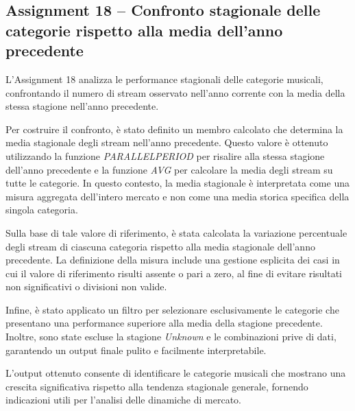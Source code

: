 \subsection*{Assignment 18 -- Confronto stagionale delle categorie rispetto alla media dell’anno precedente}

L’Assignment 18 analizza le performance stagionali delle categorie musicali,
confrontando il numero di stream osservato nell’anno corrente con la media della
stessa stagione nell’anno precedente.

Per costruire il confronto, è stato definito un membro calcolato che determina la
media stagionale degli stream nell’anno precedente. Questo valore è ottenuto
utilizzando la funzione \textit{PARALLELPERIOD} per risalire alla stessa stagione
dell’anno precedente e la funzione \textit{AVG} per calcolare la media degli
stream su tutte le categorie. In questo contesto, la media stagionale è
interpretata come una misura aggregata dell’intero mercato e non come una media
storica specifica della singola categoria.

Sulla base di tale valore di riferimento, è stata calcolata la variazione
percentuale degli stream di ciascuna categoria rispetto alla media stagionale
dell’anno precedente. La definizione della misura include una gestione esplicita
dei casi in cui il valore di riferimento risulti assente o pari a zero, al fine
di evitare risultati non significativi o divisioni non valide.

Infine, è stato applicato un filtro per selezionare esclusivamente le categorie
che presentano una performance superiore alla media della stagione precedente.
Inoltre, sono state escluse la stagione \textit{Unknown} e le combinazioni prive
di dati, garantendo un output finale pulito e facilmente interpretabile.

L’output ottenuto consente di identificare le categorie musicali che mostrano una
crescita significativa rispetto alla tendenza stagionale generale, fornendo
indicazioni utili per l’analisi delle dinamiche di mercato.
